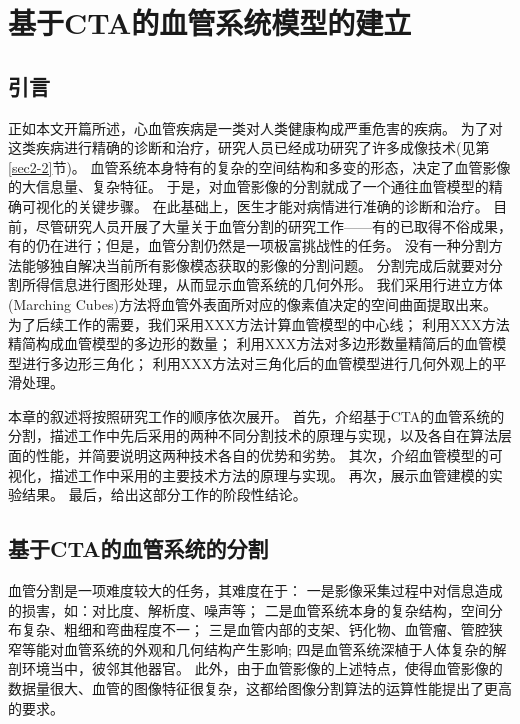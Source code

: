 \chapter{基于CTA的血管系统模型的建立}
\label{chap3} \fontsize{12pt}{12pt}\selectfont

\section{引言}

正如本文开篇所述，心血管疾病是一类对人类健康构成严重危害的疾病。
为了对这类疾病进行精确的诊断和治疗，研究人员已经成功研究了许多成像技术(见第\ref{sec2-2}节)。
血管系统本身特有的复杂的空间结构和多变的形态，决定了血管影像的大信息量、复杂特征。
于是，对血管影像的分割就成了一个通往血管模型的精确可视化的关键步骤。
在此基础上，医生才能对病情进行准确的诊断和治疗。
目前，尽管研究人员开展了大量关于血管分割的研究工作——有的已取得不俗成果，有的仍在进行；但是，血管分割仍然是一项极富挑战性的任务\cite{Lesage2009Review}。
没有一种分割方法能够独自解决当前所有影像模态获取的影像的分割问题。
分割完成后就要对分割所得信息进行图形处理，从而显示血管系统的几何外形。
我们采用行进立方体(Marching Cubes)方法\cite{Lorensen1987MC}将血管外表面所对应的像素值决定的空间曲面提取出来。
为了后续工作的需要，我们采用XXX方法计算血管模型的中心线；
利用XXX方法精简构成血管模型的多边形的数量；
利用XXX方法对多边形数量精简后的血管模型进行多边形三角化；
利用XXX方法对三角化后的血管模型进行几何外观上的平滑处理。

本章的叙述将按照研究工作的顺序依次展开。
首先，介绍基于CTA的血管系统的分割，描述工作中先后采用的两种不同分割技术的原理与实现，以及各自在算法层面的性能，并简要说明这两种技术各自的优势和劣势。
其次，介绍血管模型的可视化，描述工作中采用的主要技术方法的原理与实现。
再次，展示血管建模的实验结果。
最后，给出这部分工作的阶段性结论。

\section{基于CTA的血管系统的分割}

血管分割是一项难度较大的任务，其难度在于\cite{Lesage2009Review}：
一是影像采集过程中对信息造成的损害，如：对比度、解析度、噪声等；
二是血管系统本身的复杂结构，空间分布复杂、粗细和弯曲程度不一；
三是血管内部的支架、钙化物、血管瘤、管腔狭窄等能对血管系统的外观和几何结构产生影响;
四是血管系统深植于人体复杂的解剖环境当中，彼邻其他器官。
此外，由于血管影像的上述特点，使得血管影像的数据量很大、血管的图像特征很复杂，这都给图像分割算法的运算性能提出了更高的要求。

